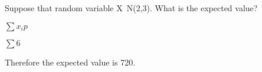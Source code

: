 \documentclass[11pt]{article}
\begin{document}
Suppose that random variable X~N(2,3). What is the expected value?



$\displaystyle{\sum}x_ip$

$\displaystyle{\sum}6$

Therefore the expected value is 720.
\end{document}

